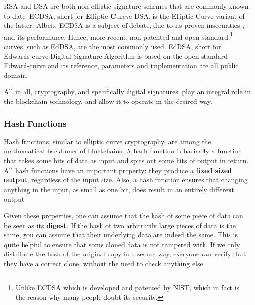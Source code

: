 RSA and DSA are both non-elliptic signature schemes that are commonly known to date. ECDSA, short
for \textbf{E}lliptic \textbf{C}ureve DSA, is the Elliptic Curve variant of the latter. Albeit,
ECDSA is a subject of debate, due to its proven insecurities
\cite{Brumley_Tuveri_2011_remote_timing_ecdsa}, and its performance. Hence, more recent,
non-patented and open standard \footnote{Unlike ECDSA which is developed and patented by NIST, which
in fact is the reason why many people doubt its security.} curves, such as EdDSA, are the most
commonly used. EdDSA, short for Edwards-curve Digital Signature Algorithm is based on the open
standard Edward-curve and its reference, parameters and implementation are all public domain.

All in all, cryptography, and specifically digital signatures, play an integral role in the blockchain
technology, and allow it to operate in the desired way.

\subsubsection{Hash Functions} \label{chap_bg:subsec:hash}

Hash functions, similar to elliptic curve cryptography, are among the mathematical backbones of
blockchains. A hash function is basically a function that takes some bits of data as input and spits
out some bits of output in return. All hash functions have an important property: they produce
a \textbf{fixed sized output}, regardless of the input size. Also, a hash function ensures that
changing anything in the input, as small as one bit, does result in an entirely different output.

Given these properties, one can assume that the hash of some piece of data can be seen as its \textbf{digest}.
If the hash of two arbitrarily large pieces of data is the same, you can assume that their
underlying data are indeed the same. This is quite helpful to ensure that some cloned data is not
tampered with. If we only distribute the hash of the original copy in a secure way, everyone can verify
that they have a correct clone, without the need to check anything else.

